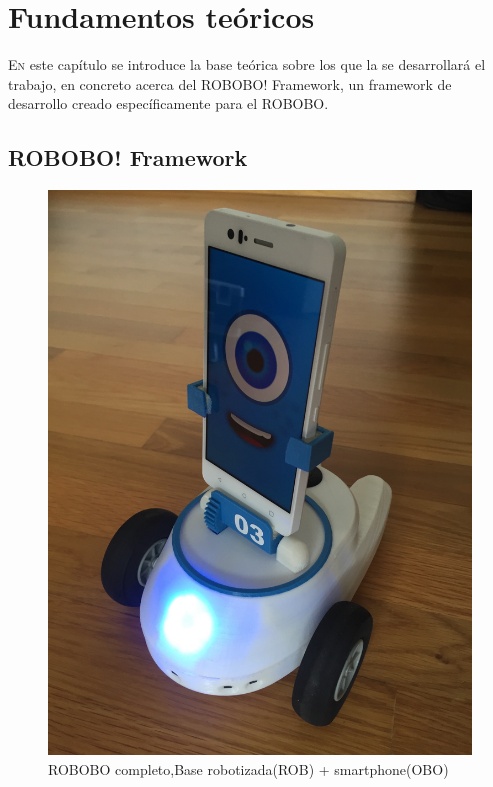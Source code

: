 \chapter{Fundamentos teóricos}
\label{chap:fundamentos-teoricos}
\vspace{0.5cm}



\lettrine{E}{n} este capítulo se introduce la base teórica sobre los que la se desarrollará el trabajo, en concreto acerca del ROBOBO! Framework, un framework de desarrollo creado específicamente para el ROBOBO.



\section{ROBOBO! Framework}
\label{sec:robobo-framework}


\begin{figure}
	\centering
	\includegraphics[width=0.7\linewidth]{imagenes/rob_obo.JPG}
	\caption{ROBOBO completo,Base robotizada(ROB) + smartphone(OBO)}
	\label{fig:rob_obo}
\end{figure}


